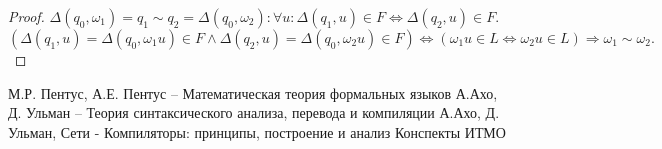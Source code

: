 \documentclass[11pt,a4paper]{article}
\theoremstyle{definition}
\theoremstyle{definition}
\theoremstyle{definition}
\begin{document}
\begin{proof}
$\Delta(q_0,\omega_1)=q_1\sim q_2=\Delta(q_0, \omega_2): \forall u :\Delta(q_1,u)\in F\Leftrightarrow\Delta (q_2, u)\in F.$\\
\[(\Delta(q_1, u)=\Delta(q_0, \omega_1 u) \in F\wedge \Delta(q_2, u)=\Delta(q_0,\omega_2 u)\in F)\Leftrightarrow(\omega_1 u\in L\Leftrightarrow\omega_2 u\in L)\Rightarrow \omega_1\sim\omega_2.\]
\end{proof}
\newpage
\begin{thebibliography}{0}
М.Р. Пентус, А.Е. Пентус -- Математическая теория формальных языков
А.Ахо, Д. Ульман -- Теория синтаксического анализа, перевода и компиляции
А.Ахо, Д. Ульман, Сети - Компиляторы: принципы, построение и анализ
Конспекты ИТМО
\end{thebibliography}
\end{document}

